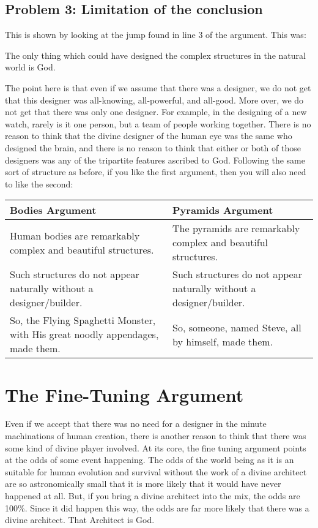 \subsection{Problem 3: Limitation of the conclusion}

This is shown by looking at the jump found in line 3 of the argument. This was:

    \begin{center}The only thing which could have designed the complex structures in the natural world is God.\end{center}

The point here is that even if we assume that there was a designer, we do not get that this designer was all-knowing, all-powerful, and all-good. More over, we do not get that there was only one designer. For example, in the designing of a new watch, rarely is it one person, but a team of people working together. There is no reason to think that the divine designer of the human eye was the same who designed the brain, and there is no reason to think that either or both of those designers was any of the tripartite features ascribed to God. Following the same sort of structure as before, if you like the first argument, then you will also need to like the second:


\noindent
\begin{tabular}{p{2.75in}|p{2.75in}}
Bodies Argument&Pyramids Argument\\\hline
    Human bodies are remarkably complex and beautiful structures.&The pyramids are remarkably complex and beautiful structures.\\
    Such structures do not appear naturally without a designer/builder.&Such structures do not appear naturally without a designer/builder.\\
    So, the Flying Spaghetti Monster, with His great noodly appendages, made them.&So, someone, named Steve, all by himself, made them.
\end{tabular}

\section{The Fine-Tuning Argument}
Even if we accept that there was no need for a designer in the minute machinations of human creation, there is another reason to think that there was some kind of divine player involved. At its core, the fine tuning argument points at the odds of some event happening. The odds of the world being as it is an suitable for human evolution and survival without the work of a divine architect are so astronomically small that it is more likely that it would have never happened at all. But, if you bring a divine architect into the mix, the odds are 100\%. Since it did happen this way, the odds are far more likely that there was a divine architect. That Architect is God.

